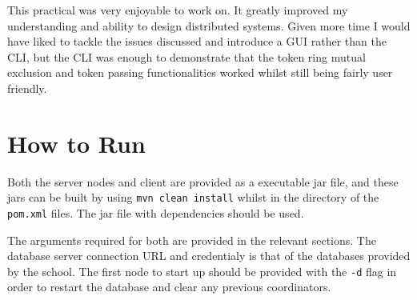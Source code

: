 \documentclass[12pt]{article}
\begin{document}
This practical was very enjoyable to work on. It greatly improved my understanding and ability to design distributed systems. Given more time I would have liked to tackle the issues discussed and introduce a GUI rather than the CLI, but the CLI was enough to demonstrate that the token ring mutual exclusion and token passing functionalities worked whilst still being fairly user friendly.

\section{How to Run}

Both the server nodes and client are provided as a executable jar file, and these jars can be built by using \lstinline{mvn clean install} whilst in the directory of the \lstinline{pom.xml} files. The jar file with dependencies should be used.

The arguments required for both are provided in the relevant sections. The database server connection URL and credentialy is that of the databases provided by the school. The first node to start up should be provided with the \lstinline{-d} flag in order to restart the database and clear any previous coordinators.



\end{document}
